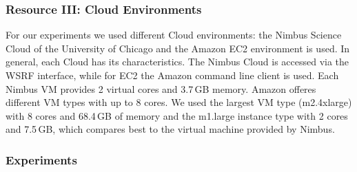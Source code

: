 \documentclass[3p,twocolumn]{elsarticle}
\begin{document}
\subsubsection*{Resource III: Cloud Environments}

For our experiments we used different Cloud environments: the Nimbus
Science Cloud of the University of Chicago and the Amazon EC2
environment is used. In general, each Cloud has its
characteristics. The Nimbus Cloud is accessed via the WSRF interface,
while for EC2 the Amazon command line client is used. Each Nimbus VM
provides 2 virtual cores and 3.7\,GB memory.  Amazon offeres different
VM types with up to 8 cores. We used the largest VM type (m2.4xlarge)
with 8 cores and 68.4\,GB of memory and the m1.large instance type
with 2 cores and 7.5\,GB, which compares best to the virtual machine
provided by Nimbus.


\subsubsection{Experiments} 
\end{document}
